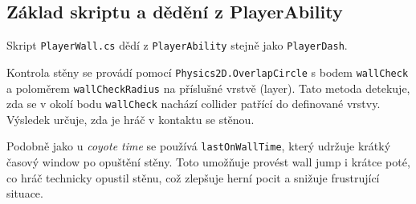 \subsection{Základ skriptu a dědění z PlayerAbility}

Skript \texttt{PlayerWall.cs} dědí z \texttt{PlayerAbility} stejně jako \texttt{PlayerDash}.

Kontrola stěny se provádí pomocí \texttt{Physics2D.OverlapCircle} s bodem \texttt{wallCheck} a poloměrem \texttt{wallCheckRadius} na příslušné vrstvě (layer). Tato metoda detekuje, zda se v okolí bodu \texttt{wallCheck} nachází collider patřící do definované vrstvy. Výsledek určuje, zda je hráč v kontaktu se stěnou.

Podobně jako u \textit{coyote time} se používá \texttt{lastOnWallTime}, který udržuje krátký časový window po opuštění stěny. Toto umožňuje provést wall jump i krátce poté, co hráč technicky opustil stěnu, což zlepšuje herní pocit a snižuje frustrující situace.